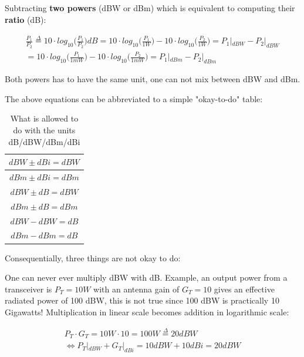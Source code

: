 Subtracting \textbf{two powers} (dBW or dBm) which is equivalent to computing their \textbf{ratio} (dB):

\begin{equation}
\begin{split}
    \frac{P_1}{P_2} \overset{\Delta}{=} 10 \cdot log_{10}\Big(\frac{P_1}{P_2}\Big) dB = 10 \cdot log_{10}\Big(\frac{P_1}{1W}\Big) - 10 \cdot log_{10}\Big(\frac{P_2}{1W}\Big) = P_1|_{dBW} - P_2|_{dBW}\\
    = 10 \cdot log_{10}\Big(\frac{P_1}{1mW}\Big) - 10 \cdot log_{10}\Big(\frac{P_2}{1mW}\Big) = P_1|_{dBm} - P_2|_{dBm}
\end{split}
\end{equation}

Both powers has to have the same unit, one can not mix between dBW and dBm. 

The above equations can be abbreviated to a simple "okay-to-do" table:

\begin{table}[h!]
\centering
\begin{tabular}{|c|}
\hline
$dBW  \pm dBi = dBW$\\
\hline
$dBm \pm  dBi = dBm$ \\ 
\hline
$dBW  \pm  dB = dBW$ \\ 
\hline
$dBm \pm dB = dBm$ \\  
\hline
$dBW - dBW = dB$ \\
\hline
$dBm - dBm = dB$ \\
\hline
\end{tabular}
\caption{What is allowed to do with the units dB/dBW/dBm/dBi}
\label{table:1}
\end{table}

Consequentially, three things are not okay to do:

One can never ever multiply dBW with dB. Example, an output power from a transceiver is $P_T = 10W$ with an antenna gain of $G_T = 10$ gives an effective radiated power of 100 dBW, this is not true since 100 dBW is practically 10 Gigawatts! Multiplication in linear scale becomes addition in logarithmic scale: 

\begin{equation}
\begin{split}
    P_T \cdot G_T = 10W \cdot 10 = 100W \overset{\Delta}{=} 20dBW\\
    \Leftrightarrow  P_T|_{dBW} + G_T|_{dBi} = 10dBW + 10dBi = 20dBW  
\end{split}
\end{equation}

